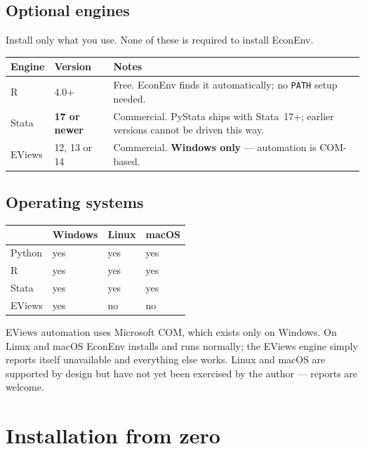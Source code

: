 \documentclass[11pt,a4paper]{report}
\begin{document}
\section{Optional engines}

Install only what you use. None of these is required to install EconEnv.

\begin{center}
\begin{tabular}{@{}llp{6.6cm}@{}}
\toprule
\textbf{Engine} & \textbf{Version} & \textbf{Notes} \\
\midrule
R & 4.0+ & Free. EconEnv finds it automatically; no \texttt{PATH} setup needed. \\
Stata & \textbf{17 or newer} & Commercial. PyStata ships with Stata~17+; earlier versions cannot be driven this way. \\
EViews & 12, 13 or 14 & Commercial. \textbf{Windows only} --- automation is COM-based. \\
\bottomrule
\end{tabular}
\end{center}

\section{Operating systems}

\begin{center}
\begin{tabular}{@{}llll@{}}
\toprule
 & \textbf{Windows} & \textbf{Linux} & \textbf{macOS} \\
\midrule
Python & yes & yes & yes \\
R      & yes & yes & yes \\
Stata  & yes & yes & yes \\
EViews & yes & no  & no \\
\bottomrule
\end{tabular}
\end{center}

\begin{warn}
EViews automation uses Microsoft COM, which exists only on Windows. On Linux
and macOS EconEnv installs and runs normally; the EViews engine simply reports
itself unavailable and everything else works. Linux and macOS are supported by
design but have not yet been exercised by the author --- reports are welcome.
\end{warn}

\chapter{Installation from zero}
\label{ch:install}
\end{document}
